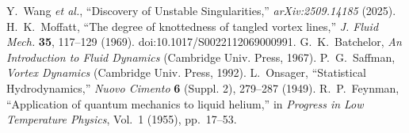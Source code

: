 \documentclass[10pt,reprint,aps,onecolumn,nofootinbib]{revtex4-2}
\begin{document}
\begin{thebibliography}{99}
        Y.~Wang \emph{et al.}, ``Discovery of Unstable Singularities,''
        \emph{arXiv:2509.14185} (2025).
        H.~K.~Moffatt, ``The degree of knottedness of tangled vortex lines,'' \emph{J. Fluid Mech.} \textbf{35}, 117--129 (1969). doi:10.1017/S0022112069000991.
        G.~K.~Batchelor, \emph{An Introduction to Fluid Dynamics} (Cambridge Univ. Press, 1967).
        P.~G.~Saffman, \emph{Vortex Dynamics} (Cambridge Univ. Press, 1992).
        L.~Onsager, ``Statistical Hydrodynamics,'' \emph{Nuovo Cimento} \textbf{6} (Suppl. 2), 279--287 (1949).
        R.~P.~Feynman, ``Application of quantum mechanics to liquid helium,'' in \emph{Progress in Low Temperature Physics}, Vol.~1 (1955), pp.~17--53.
    \end{thebibliography}
\end{document}
